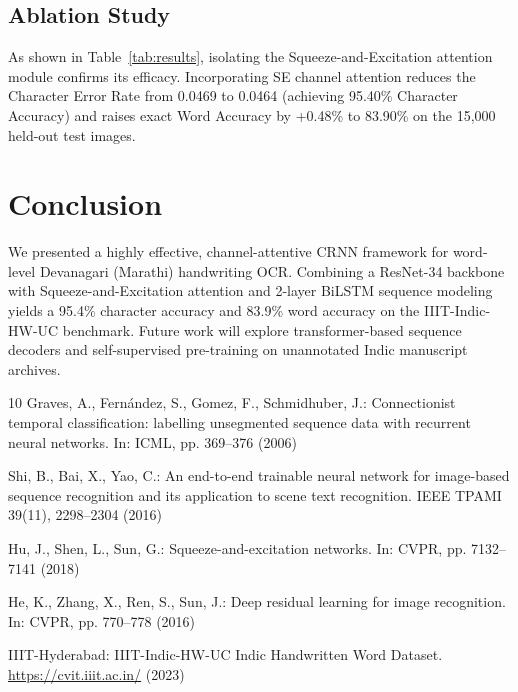 \documentclass[runningheads]{llncs}
\begin{document}
\subsection{Ablation Study}
As shown in Table~\ref{tab:results}, isolating the Squeeze-and-Excitation attention module confirms its efficacy. Incorporating SE channel attention reduces the Character Error Rate from 0.0469 to 0.0464 (achieving 95.40\% Character Accuracy) and raises exact Word Accuracy by +0.48\% to 83.90\% on the 15,000 held-out test images.


\section{Conclusion}
We presented a highly effective, channel-attentive CRNN framework for word-level Devanagari (Marathi) handwriting OCR. Combining a ResNet-34 backbone with Squeeze-and-Excitation attention and 2-layer BiLSTM sequence modeling yields a 95.4\% character accuracy and 83.9\% word accuracy on the IIIT-Indic-HW-UC benchmark. Future work will explore transformer-based sequence decoders and self-supervised pre-training on unannotated Indic manuscript archives.

\begin{thebibliography}{10}
Graves, A., Fernández, S., Gomez, F., Schmidhuber, J.: Connectionist temporal classification: labelling unsegmented sequence data with recurrent neural networks. In: ICML, pp. 369--376 (2006)

Shi, B., Bai, X., Yao, C.: An end-to-end trainable neural network for image-based sequence recognition and its application to scene text recognition. IEEE TPAMI 39(11), 2298--2304 (2016)

Hu, J., Shen, L., Sun, G.: Squeeze-and-excitation networks. In: CVPR, pp. 7132--7141 (2018)

He, K., Zhang, X., Ren, S., Sun, J.: Deep residual learning for image recognition. In: CVPR, pp. 770--778 (2016)

IIIT-Hyderabad: IIIT-Indic-HW-UC Indic Handwritten Word Dataset. \url{https://cvit.iiit.ac.in/} (2023)
\end{thebibliography}
\end{document}
